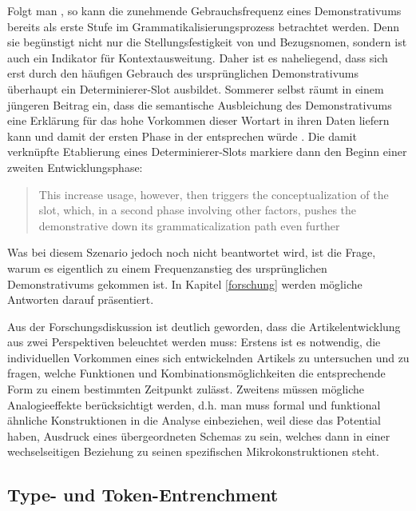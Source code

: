 Folgt man \textcite[194]{Himmelmann1997}, so kann die zunehmende Gebrauchsfrequenz eines Demonstrativums  bereits als erste Stufe im Grammatikalisierungsprozess  betrachtet werden. Denn sie begünstigt nicht nur die Stellungsfestigkeit von  und Bezugsnomen, sondern ist auch ein Indikator für  Kontextausweitung. Daher ist es naheliegend, dass sich erst durch den häufigen Gebrauch des ursprünglichen Demonstrativums  überhaupt  ein Determinierer-Slot ausbildet. Sommerer selbst räumt in einem jüngeren Beitrag ein, dass die semantische Ausbleichung des Demonstrativums  eine Erklärung für das hohe Vorkommen dieser Wortart in ihren Daten liefern kann und damit der ersten Phase in der  entsprechen würde \parencite[127]{Sommerer2015}. Die damit verknüpfte Etablierung eines Determinierer-Slots markiere dann den Beginn einer zweiten Entwicklungsphase: \blockcquote[127]{Sommerer2015}{This increase usage, however, then triggers the conceptualization of the slot, which, in a second phase involving other factors, pushes the demonstrative down its grammaticalization path even further}. 
Was bei diesem Szenario jedoch noch nicht beantwortet wird, ist die Frage, warum es eigentlich zu einem Frequenzanstieg des ursprünglichen Demonstrativums  gekommen ist. In Kapitel \ref{forschung} werden mögliche Antworten darauf präsentiert. 

Aus der Forschungsdiskussion ist deutlich geworden, dass die Artikelentwicklung aus zwei Perspektiven beleuchtet werden muss:  Erstens ist es notwendig, die individuellen Vorkommen eines sich entwickelnden Artikels zu untersuchen und zu fragen, welche Funktionen und Kombinationsmöglichkeiten die entsprechende Form zu einem bestimmten Zeitpunkt zulässt. Zweitens müssen mögliche Analogieeffekte  berücksichtigt werden, d.h. man muss formal und funktional ähnliche Konstruktionen in die Analyse einbeziehen, weil diese das Potential haben, Ausdruck eines übergeordneten Schemas  zu sein, welches dann in einer wechselseitigen Beziehung zu seinen spezifischen Mikrokonstruktionen  steht. 

\subsection{Type- und Token-Entrenchment}\label{sec:entrenchment}

